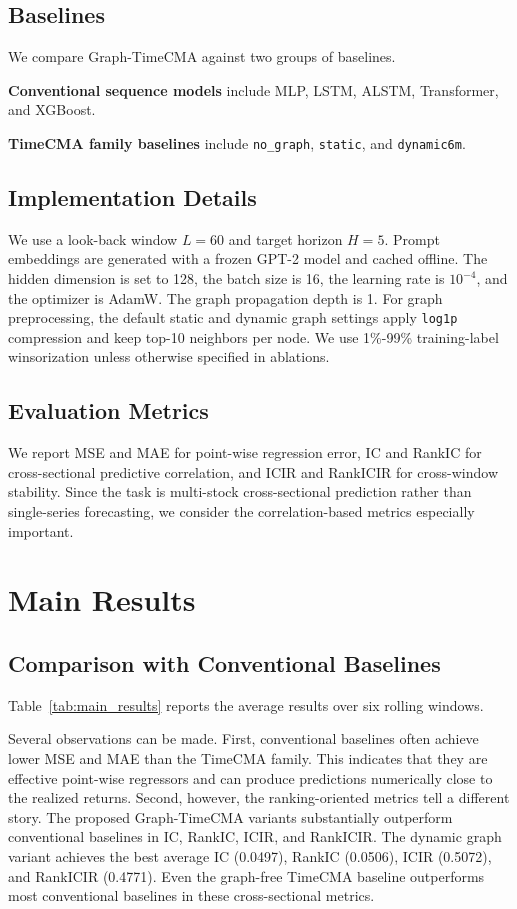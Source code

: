 \subsection{Baselines}

We compare Graph-TimeCMA against two groups of baselines.

\textbf{Conventional sequence models} include MLP, LSTM, ALSTM, Transformer, and XGBoost.

\textbf{TimeCMA family baselines} include \texttt{no\_graph}, \texttt{static}, and \texttt{dynamic6m}.

\subsection{Implementation Details}

We use a look-back window $L = 60$ and target horizon $H = 5$. Prompt embeddings are generated with a frozen GPT-2 model and cached offline. The hidden dimension is set to 128, the batch size is 16, the learning rate is $10^{-4}$, and the optimizer is AdamW. The graph propagation depth is 1. For graph preprocessing, the default static and dynamic graph settings apply \texttt{log1p} compression and keep top-10 neighbors per node. We use 1\%-99\% training-label winsorization unless otherwise specified in ablations.

\subsection{Evaluation Metrics}

We report MSE and MAE for point-wise regression error, IC and RankIC for cross-sectional predictive correlation, and ICIR and RankICIR for cross-window stability. Since the task is multi-stock cross-sectional prediction rather than single-series forecasting, we consider the correlation-based metrics especially important.

\section{Main Results}

\subsection{Comparison with Conventional Baselines}

Table~\ref{tab:main_results} reports the average results over six rolling windows.

Several observations can be made. First, conventional baselines often achieve lower MSE and MAE than the TimeCMA family. This indicates that they are effective point-wise regressors and can produce predictions numerically close to the realized returns. Second, however, the ranking-oriented metrics tell a different story. The proposed Graph-TimeCMA variants substantially outperform conventional baselines in IC, RankIC, ICIR, and RankICIR. The dynamic graph variant achieves the best average IC (0.0497), RankIC (0.0506), ICIR (0.5072), and RankICIR (0.4771). Even the graph-free TimeCMA baseline outperforms most conventional baselines in these cross-sectional metrics.

